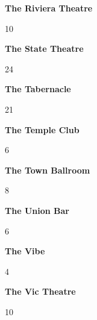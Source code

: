 \begin{center}\textbf{The Riviera Theatre}\end{center}
\begin{center}10\end{center} 
\newline 
\begin{center}\textbf{The State Theatre}\end{center}
\begin{center}24\end{center} 
\newline 
\begin{center}\textbf{The Tabernacle}\end{center}
\begin{center}21\end{center} 
\newline 
\begin{center}\textbf{The Temple Club}\end{center}
\begin{center}6\end{center} 
\newline 
\begin{center}\textbf{The Town Ballroom}\end{center}
\begin{center}8\end{center} 
\newline 
\begin{center}\textbf{The Union Bar}\end{center}
\begin{center}6\end{center} 
\newline 
\begin{center}\textbf{The Vibe}\end{center}
\begin{center}4\end{center} 
\newline 
\begin{center}\textbf{The Vic Theatre}\end{center}
\begin{center}10\end{center} 
